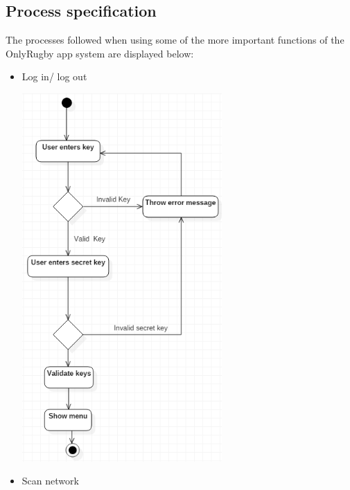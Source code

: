 \documentclass[a4paper,12pt]{report}
\begin{document}
\subsection{Process specification}
The processes followed when using some of the more important functions of the OnlyRugby app system are displayed below:
\begin{itemize}
	\item Log in/ log out
		\begin{center}
  	 	\includegraphics[width=0.6\textwidth] {./Diagrams/LoginSequence.png}\\[0.4cm]    
		\end{center}
	\item Scan network
		\begin{center}

\end{center}
\end{itemize}
\end{document}
